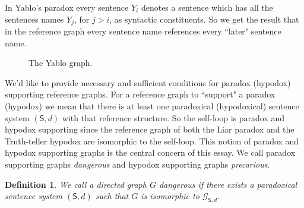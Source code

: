 \documentclass[12pt]{kluwer}
\newtheorem{defn}{Definition}
\theoremstyle{remark}
\newcommand{\fancy}[1]{\mathcal{#1}}
\def\S{\textsf{S}}
\def\G{\fancy{G}}
\begin{document}
In Yablo's paradox every sentence $Y_i$ denotes a sentence which has all the sentences names $Y_j$, for $j>i$, as syntactic constituents. So we get the result that in the reference graph every sentence name references every ``later" sentence name.


\begin{figure}[h]
\centering
{}
\caption{The Yablo graph.}
\label{fig:yablo}
\end{figure}

We'd like to provide necessary and sufficient conditions for paradox (hypodox) supporting reference graphs. For a reference graph to ``support" a paradox (hypodox) we mean that there is at least one paradoxical (hypodoxical) sentence system $(\S, d)$ with that reference structure. So the self-loop is paradox and hypodox supporting since the reference graph of both the Liar paradox and the Truth-teller hypodox are isomorphic to the self-loop. This notion of paradox and hypodox supporting graphs is the central concern of this essay. We call paradox supporting graphs \textit{dangerous} and hypodox supporting graphs \textit{precarious}.

\begin{defn} 
We call a directed graph $G$ \emph{dangerous} if there exists a paradoxical sentence system $(\S, d)$ such that $G$ is isomorphic to $\G_{\S, d}$.
\end{defn}
\end{document}
